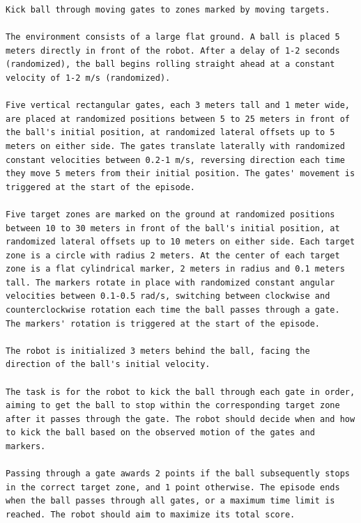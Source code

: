 \begin{lstlisting}[language={}]
Kick ball through moving gates to zones marked by moving targets.

The environment consists of a large flat ground. A ball is placed 5 meters directly in front of the robot. After a delay of 1-2 seconds (randomized), the ball begins rolling straight ahead at a constant velocity of 1-2 m/s (randomized).

Five vertical rectangular gates, each 3 meters tall and 1 meter wide, are placed at randomized positions between 5 to 25 meters in front of the ball's initial position, at randomized lateral offsets up to 5 meters on either side. The gates translate laterally with randomized constant velocities between 0.2-1 m/s, reversing direction each time they move 5 meters from their initial position. The gates' movement is triggered at the start of the episode.

Five target zones are marked on the ground at randomized positions between 10 to 30 meters in front of the ball's initial position, at randomized lateral offsets up to 10 meters on either side. Each target zone is a circle with radius 2 meters. At the center of each target zone is a flat cylindrical marker, 2 meters in radius and 0.1 meters tall. The markers rotate in place with randomized constant angular velocities between 0.1-0.5 rad/s, switching between clockwise and counterclockwise rotation each time the ball passes through a gate. The markers' rotation is triggered at the start of the episode.

The robot is initialized 3 meters behind the ball, facing the direction of the ball's initial velocity.

The task is for the robot to kick the ball through each gate in order, aiming to get the ball to stop within the corresponding target zone after it passes through the gate. The robot should decide when and how to kick the ball based on the observed motion of the gates and markers.

Passing through a gate awards 2 points if the ball subsequently stops in the correct target zone, and 1 point otherwise. The episode ends when the ball passes through all gates, or a maximum time limit is reached. The robot should aim to maximize its total score.
\end{lstlisting}

